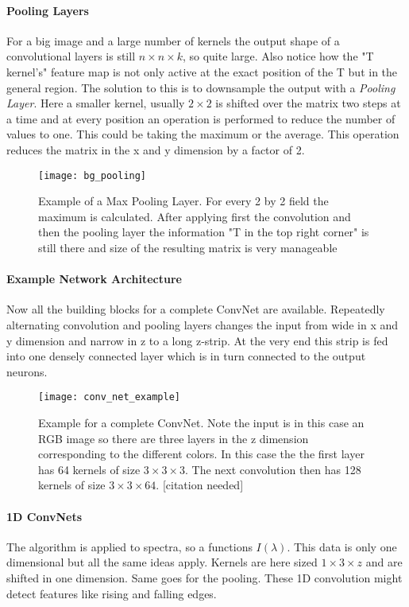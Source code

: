 \paragraph{Pooling Layers}
For a big image and a large number of kernels the output shape of a convolutional layers is still $n \times n \times k$, so quite large. Also notice how the "T kernel's" feature map is not only active at the exact position of the T but in the general region. The solution to this is to downsample the output with a \textit{Pooling Layer}. Here a smaller kernel, usually $2 \times 2$ is shifted over the matrix two steps at a time and at every position an operation is performed to reduce the number of values to one. This could be taking the maximum or the average. This operation reduces the matrix in the x and y dimension by a factor of 2.

\begin{figure}[H]
    \centering
    \texttt{[image: bg\_pooling]}
    \caption{Example of a Max Pooling Layer. For every 2 by 2 field the maximum is calculated. After applying first the convolution and then the pooling layer the information "T in the top right corner" is still there and size of the resulting matrix is very manageable}
    \label{fig:bg:pooling}
\end{figure}

\paragraph{Example Network Architecture}
Now all the building blocks for a complete ConvNet are available. Repeatedly alternating convolution and pooling layers changes the input from wide in x and y dimension and narrow in z to a long z-strip. At the very end this strip is fed into one densely connected layer which is in turn connected to the output neurons.

\begin{figure}[H]
    \centering
    \texttt{[image: conv\_net\_example]}
    \caption{Example for a complete ConvNet. Note the input is in this case an RGB image so there are three layers in the z dimension corresponding to the different colors. In this case the the first layer has 64 kernels of size $3 \times 3 \times 3$. The next convolution then has 128 kernels of size $3 \times 3 \times 64$. [citation needed]}
    \label{fig:bg:NN_example}
\end{figure}

\newpage
\paragraph{1D ConvNets}
The algorithm is applied to spectra, so a functions $I(\lambda)$. This data is only one dimensional but all the same ideas apply. Kernels are here sized $1 \times 3 \times z$ and are shifted in one dimension. Same goes for the pooling. These 1D convolution might detect features like rising and falling edges.

